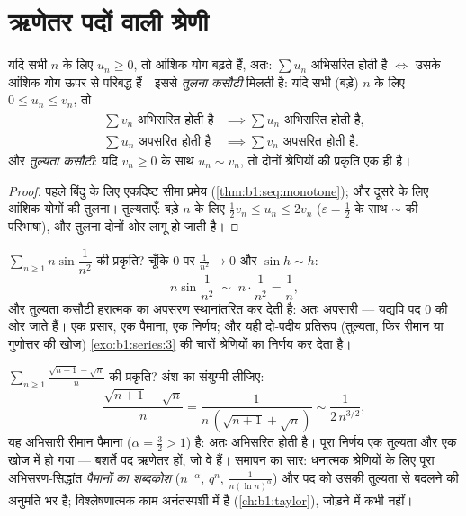 \section{ऋणेतर पदों वाली श्रेणी}

\begin{theorem}[परिबद्ध आंशिक योग]\label{thm:b1:series:positive}
यदि सभी $n$ के लिए $u_n \geq 0$, तो आंशिक योग बढ़ते हैं, अतः: $\sum u_n$
अभिसरित होती है $\iff$ उसके आंशिक योग ऊपर से परिबद्ध हैं। इससे \emph{तुलना
कसौटी} मिलती है: यदि सभी (बड़े) $n$ के लिए $0 \leq u_n \leq v_n$, तो
\begin{align*}
\sum v_n \text{ अभिसरित होती है} &\implies \sum u_n \text{ अभिसरित होती है},\\
\sum u_n \text{ अपसरित होती है} &\implies \sum v_n \text{ अपसरित होती है}.
\end{align*}
और \emph{तुल्यता कसौटी}: यदि $v_n \geq 0$ के साथ $u_n \sim v_n$, तो दोनों
श्रेणियों की प्रकृति एक ही है।
\end{theorem}

\begin{proof}
पहले बिंदु के लिए एकदिष्ट सीमा प्रमेय (\cref{thm:b1:seq:monotone}); और दूसरे
के लिए आंशिक योगों की तुलना। तुल्यताएँ: बड़े $n$ के लिए $\frac12 v_n \leq
u_n \leq 2 v_n$ ($\varepsilon = \frac12$ के साथ $\sim$ की परिभाषा), और तुलना
दोनों ओर लागू हो जाती है।
\end{proof}

\begin{example}[एक तुल्यता जो अपसरण सिद्ध कर देती है]\label{ex:b1:series:equivdiverge}
$\sum_{n\geq1} n\sin\dfrac{1}{n^2}$ की प्रकृति? चूँकि $0$ पर $\frac{1}{n^2}
\to 0$ और $\sin h \sim h$:
\[
n\sin\frac{1}{n^2} \;\sim\; n\cdot\frac{1}{n^2} = \frac1n ,
\]
और तुल्यता कसौटी हरात्मक  का अपसरण स्थानांतरित कर देती है: अतः अपसारी
--- यद्यपि पद $0$ की ओर जाते हैं। एक प्रसार, एक पैमाना, एक निर्णय; और यही
दो-पदीय प्रतिरूप (तुल्यता, फिर रीमान या गुणोत्तर की खोज)
\cref{exo:b1:series:3} की चारों श्रेणियों का निर्णय कर देता है।
\end{example}

\begin{example}[एक ही पंक्ति में तुल्यता कसौटी]\label{ex:b1:series:equivtest}
$\sum_{n \geq 1} \frac{\sqrt{n+1} - \sqrt n}{n}$ की प्रकृति? अंश का संयुग्मी
लीजिए:
\[
\frac{\sqrt{n+1} - \sqrt n}{n}
= \frac{1}{n\,(\sqrt{n+1} + \sqrt n)}
\sim \frac{1}{2\,n^{3/2}} ,
\]
यह अभिसारी रीमान पैमाना ($\alpha = \frac32 > 1$) है: अतः  अभिसरित होती
है। पूरा निर्णय एक तुल्यता और एक खोज में हो गया --- बशर्ते पद ऋणेतर हों, जो
वे हैं। समापन का सार: धनात्मक श्रेणियों के लिए पूरा अभिसरण-सिद्धांत
\emph{पैमानों का शब्दकोश} ($n^{-\alpha}$, $q^n$, $\frac{1}{n(\ln
n)^\alpha}$) और पद को उसकी तुल्यता से बदलने की अनुमति भर है; विश्लेषणात्मक
काम अनंतस्पर्शी में है (\cref{ch:b1:taylor}), जोड़ने में कभी नहीं।
\end{example}

